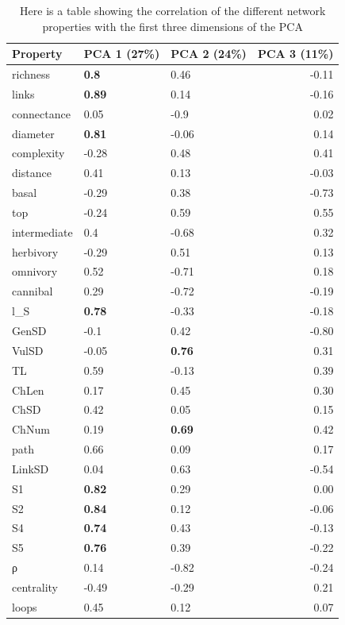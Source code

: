 \documentclass[
]{article}
\begin{document}
\begin{longtable}[]{@{}lllr@{}}

\caption{\label{tbl-corr}Here is a table showing the correlation of the
different network properties with the first three dimensions of the PCA}

\tabularnewline

\toprule\noalign{}
Property & PCA 1 (27\%) & PCA 2 (24\%) & PCA 3 (11\%) \\
\midrule\noalign{}
\endhead
\bottomrule\noalign{}
\endlastfoot
richness & \textbf{0.8} & 0.46 & -0.11 \\
links & \textbf{0.89} & 0.14 & -0.16 \\
connectance & 0.05 & -0.9 & 0.02 \\
diameter & \textbf{0.81} & -0.06 & 0.14 \\
complexity & -0.28 & 0.48 & 0.41 \\
distance & 0.41 & 0.13 & -0.03 \\
basal & -0.29 & 0.38 & -0.73 \\
top & -0.24 & 0.59 & 0.55 \\
intermediate & 0.4 & -0.68 & 0.32 \\
herbivory & -0.29 & 0.51 & 0.13 \\
omnivory & 0.52 & -0.71 & 0.18 \\
cannibal & 0.29 & -0.72 & -0.19 \\
l\_S & \textbf{0.78} & -0.33 & -0.18 \\
GenSD & -0.1 & 0.42 & -0.80 \\
VulSD & -0.05 & \textbf{0.76} & 0.31 \\
TL & 0.59 & -0.13 & 0.39 \\
ChLen & 0.17 & 0.45 & 0.30 \\
ChSD & 0.42 & 0.05 & 0.15 \\
ChNum & 0.19 & \textbf{0.69} & 0.42 \\
path & 0.66 & 0.09 & 0.17 \\
LinkSD & 0.04 & 0.63 & -0.54 \\
S1 & \textbf{0.82} & 0.29 & 0.00 \\
S2 & \textbf{0.84} & 0.12 & -0.06 \\
S4 & \textbf{0.74} & 0.43 & -0.13 \\
S5 & \textbf{0.76} & 0.39 & -0.22 \\
ρ & 0.14 & -0.82 & -0.24 \\
centrality & -0.49 & -0.29 & 0.21 \\
loops & 0.45 & 0.12 & 0.07 \\

\end{longtable}
\end{document}
